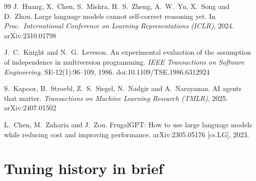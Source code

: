 \documentclass[11pt,a4paper]{article}
\begin{document}
\begin{thebibliography}{99}
J.~Huang, X.~Chen, S.~Mishra, H.~S.~Zheng, A.~W.~Yu, X.~Song and D.~Zhou.
\newblock Large language models cannot self-correct reasoning yet.
\newblock In \emph{Proc.\ International Conference on Learning
Representations (ICLR)}, 2024. arXiv:2310.01798

J.~C.~Knight and N.~G.~Leveson.
\newblock An experimental evaluation of the assumption of independence in
multiversion programming.
\newblock \emph{IEEE Transactions on Software Engineering},
SE-12(1):96--109, 1986.
\newblock doi:10.1109/TSE.1986.6312924

S.~Kapoor, B.~Stroebl, Z.~S.~Siegel, N.~Nadgir and A.~Narayanan.
\newblock AI agents that matter.
\newblock \emph{Transactions on Machine Learning Research (TMLR)}, 2025.
arXiv:2407.01502

L.~Chen, M.~Zaharia and J.~Zou.
\newblock FrugalGPT: How to use large language models while reducing cost
and improving performance.
\newblock arXiv:2305.05176 [cs.LG], 2023.

\end{thebibliography}
\normalsize

\appendix

\section{Tuning history in brief}
\label{app:tuning}
\end{document}
